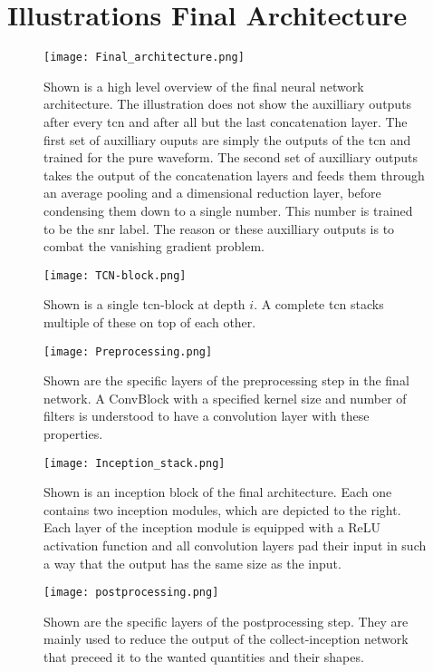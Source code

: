 \section{Illustrations Final Architecture}\label{app:illustrations_final_architecture}
\begin{figure}[H]
\centering
\texttt{[image: Final\_architecture.png]}
\caption[Overview final architecture]{Shown is a high level overview of the final neural network architecture. The illustration does not show the auxilliary outputs after every \gls{tcn} and after all but the last concatenation layer. The first set of auxilliary ouputs are simply the outputs of the \gls{tcn} and trained for the pure waveform. The second set of auxilliary outputs takes the output of the concatenation layers and feeds them through an average pooling and a dimensional reduction layer, before condensing them down to a single number. This number is trained to be the \gls{snr} label. The reason or these auxilliary outputs is to combat the vanishing gradient problem.}\label{fig:high_level_final_network}
\end{figure}
\begin{figure}[H]
\centering
\texttt{[image: TCN-block.png]}
\caption[TCN-Block]{Shown is a single \gls{tcn}-block at depth $i$. A complete \gls{tcn} stacks multiple of these on top of each other.}\label{fig:tcn_block}
\end{figure}
\begin{figure}[H]
\centering
\texttt{[image: Preprocessing.png]}
\caption[Preprocessing of inception network]{Shown are the specific layers of the preprocessing step in the final network. A ConvBlock with a specified kernel size and number of  filters is understood to have a convolution layer with these properties.}\label{fig:preprocessing}
\end{figure}
\begin{figure}[H]
\centering
\texttt{[image: Inception\_stack.png]}
\caption[Inception-Res Block]{Shown is an inception block of the final architecture. Each one contains two inception modules, which are depicted to the right. Each layer of the inception module is equipped with a ReLU activation function and all convolution layers pad their input in such a way that the output has the same size as the input.}\label{fig:inception_block}
\end{figure}
\begin{figure}[H]
\centering
\texttt{[image: postprocessing.png]}
\caption[Postprocessing of inception network]{Shown are the specific layers of the postprocessing step. They are mainly used to reduce the output of the collect-inception network that preceed it to the wanted quantities and their shapes.}\label{fig:postprocessing}
\end{figure}
